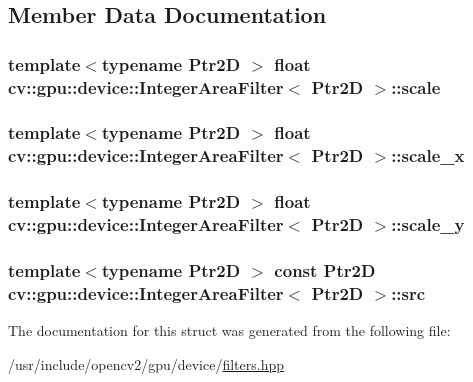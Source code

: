 \subsection{Member Data Documentation}
\hypertarget{structcv_1_1gpu_1_1device_1_1IntegerAreaFilter_af766294e022ac79f94d466710a097f47}{
\subsubsection[{scale}]{\setlength{\rightskip}{0pt plus 5cm}template$<$typename Ptr2\-D $>$ float {\bf cv\-::gpu\-::device\-::\-Integer\-Area\-Filter}$<$ Ptr2\-D $>$\-::scale}}\label{structcv_1_1gpu_1_1device_1_1IntegerAreaFilter_af766294e022ac79f94d466710a097f47}
\hypertarget{structcv_1_1gpu_1_1device_1_1IntegerAreaFilter_a9cb14c7aad58b2adb9f58fcd5477d757}{
\subsubsection[{scale\-\_\-x}]{\setlength{\rightskip}{0pt plus 5cm}template$<$typename Ptr2\-D $>$ float {\bf cv\-::gpu\-::device\-::\-Integer\-Area\-Filter}$<$ Ptr2\-D $>$\-::scale\-\_\-x}}\label{structcv_1_1gpu_1_1device_1_1IntegerAreaFilter_a9cb14c7aad58b2adb9f58fcd5477d757}
\hypertarget{structcv_1_1gpu_1_1device_1_1IntegerAreaFilter_afa02851ec89c4fc26e3eaf7e293ed1f4}{
\subsubsection[{scale\-\_\-y}]{\setlength{\rightskip}{0pt plus 5cm}template$<$typename Ptr2\-D $>$ float {\bf cv\-::gpu\-::device\-::\-Integer\-Area\-Filter}$<$ Ptr2\-D $>$\-::scale\-\_\-y}}\label{structcv_1_1gpu_1_1device_1_1IntegerAreaFilter_afa02851ec89c4fc26e3eaf7e293ed1f4}
\hypertarget{structcv_1_1gpu_1_1device_1_1IntegerAreaFilter_a00746bbccaae575eb5fbb168283206c1}{
\subsubsection[{src}]{\setlength{\rightskip}{0pt plus 5cm}template$<$typename Ptr2\-D $>$ const Ptr2\-D {\bf cv\-::gpu\-::device\-::\-Integer\-Area\-Filter}$<$ Ptr2\-D $>$\-::src}}\label{structcv_1_1gpu_1_1device_1_1IntegerAreaFilter_a00746bbccaae575eb5fbb168283206c1}


The documentation for this struct was generated from the following file\-:\begin{DoxyCompactItemize}
\item 
/usr/include/opencv2/gpu/device/\hyperlink{filters_8hpp}{filters.\-hpp}\end{DoxyCompactItemize}
